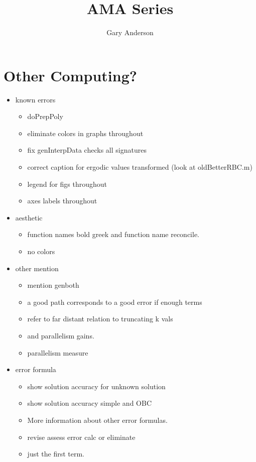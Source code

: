 \documentclass[hyperref]{labbook}
\begin{document}
\frontmatter
\title{AMA Series}
\author{Gary Anderson }
\maketitle

\printindex
\tableofcontents




\mainmatter


\section{Other Computing?}
\label{sec:other-computing}

\begin{itemize}

\item known errors
  \begin{itemize}
\item doPrepPoly
\item eliminate colors in graphs throughout
\item {fix genInterpData checks all signatures}
\item {correct caption for ergodic values transformed} (look at oldBetterRBC.m)
\item legend for figs throughout
\item axes labels throughout
  \end{itemize}

\item aesthetic
\begin{itemize}
\item function names bold greek and function name reconcile.
\item no colors
 \end{itemize}

\item other mention
  \begin{itemize}
\item {mention genboth}
\item a good path corresponds to a good error if enough terms
\item refer to far distant relation to truncating k vals
\item and parallelism gains.
\item {parallelism measure}
  \end{itemize}

\item error formula
  \begin{itemize}
\item {show solution accuracy for unknown solution}
\item {show solution accuracy simple and OBC}
\item More information about other error formulas.
\item {revise assess error calc or eliminate}
\item {just the first term.}
  \end{itemize}


\end{itemize}
\end{document}
